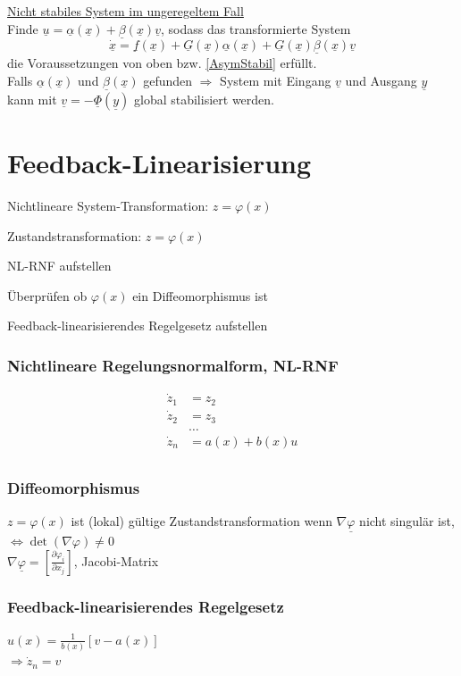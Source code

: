 \documentclass[german]{latex4ei/latex4ei_sheet}
\newcommand{\U}{\underline}
\begin{document}
\begin{sectionbox}
\underline{Nicht stabiles System im ungeregeltem Fall} \\
Finde $\U{u} = \U{\alpha}(\U{x}) + \U{\beta}(\U{x}) \U{v}$, sodass das transformierte System
$$ \dot{\U{x}} = \U{f}(\U{x}) + \U{G}(\U{x})\U{\alpha}(\U{x}) + \U{G}(\U{x}) \U{\beta}(\U{x}) \U{v}  $$
die Voraussetzungen von oben bzw. \ref{AsymStabil} erfüllt. \\
Falls $\U{\alpha}(\U{x})$ und $\U{\beta}(\U{x})$ gefunden $\Rightarrow$ System mit Eingang $\U{v}$ und Ausgang $\U{y}$ kann mit $\U{v} = -\U{\Phi}(\U{y})$ global stabilisiert werden.

\end{sectionbox}

\section{Feedback-Linearisierung}
\begin{sectionbox}
\begin{cookbox}{Nichtlineare System-Transformation: $z = \varphi (x)$}
  \item Zustandstransformation: $z = \varphi(x)$
  \item NL-RNF aufstellen
  \item Überprüfen ob $\varphi(x)$ ein Diffeomorphismus ist
  \item Feedback-linearisierendes Regelgesetz aufstellen
\end{cookbox}

\subsubsection{Nichtlineare Regelungsnormalform, NL-RNF}
\begin{align*}
  \dot{z}_1 &= z_2 \\
  \dot{z}_2 &= z_3 \\
            &\dots \\
  \dot{z}_n &= a(x) + b(x) u \\
\end{align*}

\subsubsection{Diffeomorphismus}
$z = \varphi(x)$ ist (lokal) gültige Zustandstransformation wenn $\nabla \underline{\varphi}$ nicht singulär ist, $\Leftrightarrow \det(\nabla \varphi) \neq 0$ \\
$\nabla \underline{\varphi} = \left[ \frac{\partial \varphi_i}{\partial x_j} \right]$, Jacobi-Matrix

\subsubsection{Feedback-linearisierendes Regelgesetz}
$u(x) = \frac{1}{b(x)}[v - a(x)]$ \\
$\Rightarrow \dot{z}_n = v $
\end{sectionbox}
\end{document}

